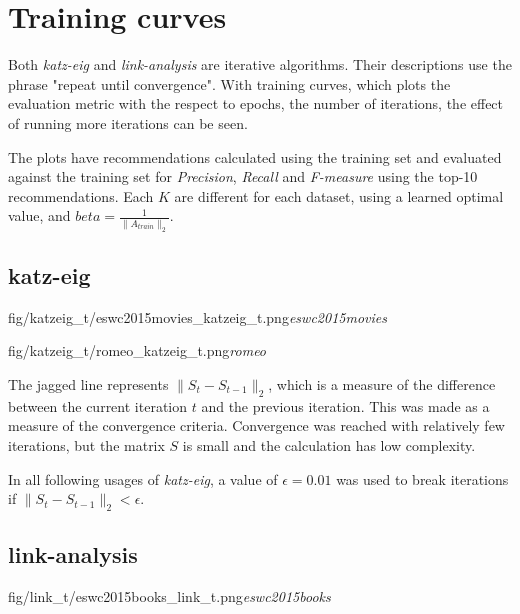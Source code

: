 
\section{Training curves}\label{sec:graphs:training_curves}

Both \textit{katz-eig} and \textit{link-analysis} are iterative algorithms. Their descriptions use the phrase "repeat until convergence".  With training curves, which plots the evaluation metric with the respect to epochs, the number of iterations, the effect of running more iterations can be seen.

The plots have recommendations calculated using the training set and evaluated against the training set for \textit{Precision}, \textit{Recall} and \textit{F-measure} using the top-10 recommendations. Each $K$ are different for each dataset, using a learned optimal value, and $beta = \frac{1}{\|A_{train}\|_2}$.

\subsection{katz-eig}

\FloatBarrier

{fig/katzeig_t/eswc2015movies_katzeig_t.png}{\textit{eswc2015movies}}

{fig/katzeig_t/romeo_katzeig_t.png}{\textit{romeo}}

\FloatBarrier

The jagged line represents $\|S_t - S_{t - 1}\|_2$, which is a measure of the difference between the current iteration $t$ and the previous iteration. This was made as a measure of the convergence criteria. Convergence was reached with relatively few iterations, but the matrix $S$ is small and the calculation has low complexity.

In all following usages of \textit{katz-eig}, a value of $\epsilon = 0.01$ was used to break iterations if $\|S_t - S_{t - 1}\|_2 < \epsilon$.

\newpage


\subsection{link-analysis}

{fig/link_t/eswc2015books_link_t.png}{\textit{eswc2015books}}

